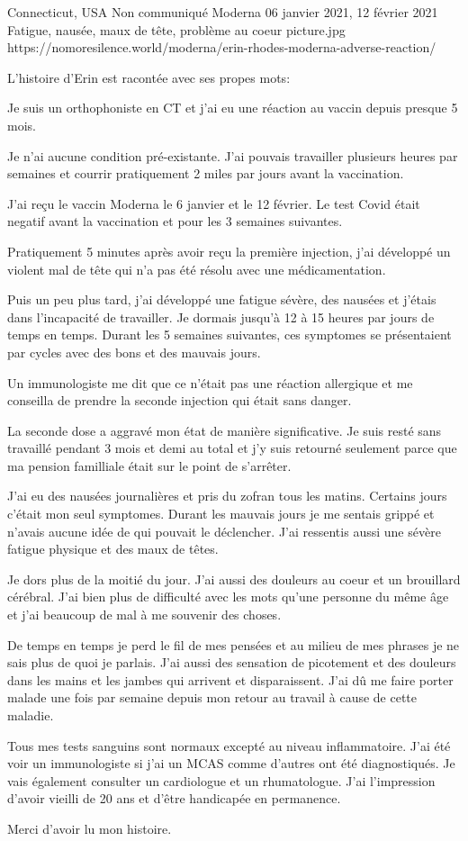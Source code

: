 {Connecticut, USA}
{Non communiqué}
{Moderna}
{06 janvier 2021, 12 février 2021}
{Fatigue, nausée, maux de tête, problème au coeur}
{picture.jpg}
{https://nomoresilence.world/moderna/erin-rhodes-moderna-adverse-reaction/}
{

L'histoire d'Erin est racontée avec ses propes mots:

Je suis un orthophoniste en CT et j'ai eu une réaction au vaccin depuis presque
5 mois.

Je n'ai aucune condition pré-existante. J'ai pouvais travailler plusieurs heures
par semaines et courrir pratiquement 2 miles par jours avant la vaccination.

J'ai reçu le vaccin Moderna le 6 janvier et le 12 février. Le test Covid était
negatif avant la vaccination et pour les 3 semaines suivantes.

Pratiquement 5 minutes après avoir reçu la première injection, j'ai développé un
violent mal de tête qui n'a pas été résolu avec une médicamentation.

Puis un peu plus tard, j'ai développé une fatigue sévère, des nausées et j'étais
dans l'incapacité de travailler. Je dormais jusqu'à 12 à 15 heures par jours de
temps en temps. Durant les 5 semaines suivantes, ces symptomes se présentaient
par cycles avec des bons et des mauvais jours.

Un immunologiste me dit que ce n'était pas une réaction allergique et me
conseilla de prendre la seconde injection qui était sans danger.

La seconde dose a aggravé mon état de manière significative. Je suis resté sans
travaillé pendant 3 mois et demi au total et j'y suis retourné seulement parce
que ma pension familliale était sur le point de s'arrêter.

J'ai eu des nausées journalières et pris du zofran tous les matins. Certains
jours c'était mon seul symptomes. Durant les mauvais jours je me sentais grippé
et n'avais aucune idée de qui pouvait le déclencher. J'ai ressentis aussi une
sévère fatigue physique et des maux de têtes.

Je dors plus de la moitié du jour. J'ai aussi des douleurs au coeur et un
brouillard cérébral. J'ai bien plus de difficulté avec les mots qu'une personne
du même âge et j'ai beaucoup de mal à me souvenir des choses.

De temps en temps je perd le fil de mes pensées et au milieu de mes phrases je
ne sais plus de quoi je parlais. J'ai aussi des sensation de picotement et des
douleurs dans les mains et les jambes qui arrivent et disparaissent. J'ai dû me
faire porter malade une fois par semaine depuis mon retour au travail à cause de
cette maladie.

Tous mes tests sanguins sont normaux excepté au niveau inflammatoire. J'ai été
voir un immunologiste si j'ai un MCAS comme d'autres ont été diagnostiqués. Je
vais également consulter un cardiologue et un rhumatologue. J'ai l'impression
d'avoir vieilli de 20 ans et d'être handicapée en permanence.

Merci d'avoir lu mon histoire.

}
